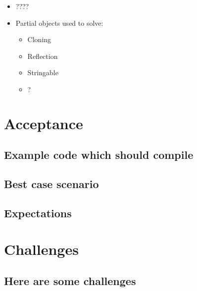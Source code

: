 \documentclass{article}
\begin{document}
\begin{itemize}
	\item ????
	\item Partial objects used to solve:
		\begin{itemize}
		\item Cloning
		\item Reflection
		\item Stringable
		\item ?
	\end{itemize}
\end{itemize}

\section{Acceptance}

\subsection{Example code which should compile}

\subsection{Best case scenario}

\subsection{Expectations}

\section{Challenges}

\subsection{Here are some challenges}
\end{document}
